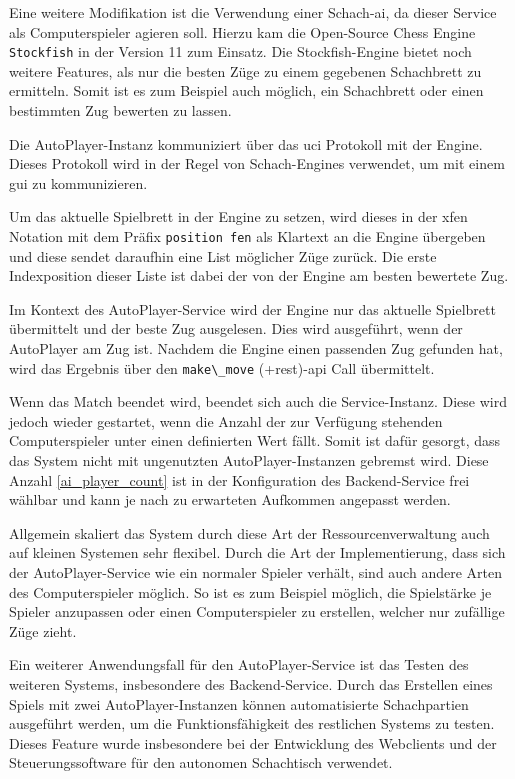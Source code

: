 Eine weitere Modifikation ist die Verwendung einer Schach-\gls{ai}, da
dieser Service als Computerspieler agieren soll. Hierzu kam die
Open-Source Chess Engine
\passthrough{\lstinline!Stockfish!}\cite{stockfish} in der Version
11 zum Einsatz. Die Stockfish-Engine bietet noch weitere Features, als
nur die besten Züge zu einem gegebenen Schachbrett zu ermitteln. Somit
ist es zum Beispiel auch möglich, ein Schachbrett oder einen bestimmten
Zug bewerten zu lassen.

Die AutoPlayer-Instanz kommuniziert über das \gls{uci}
Protokoll\cite{uciprotocol} mit der Engine. Dieses Protokoll wird in
der Regel von Schach-Engines verwendet, um mit einem \gls{gui} zu
kommunizieren.

Um das aktuelle Spielbrett in der Engine zu setzen, wird dieses in der
\gls{xfen} Notation mit dem Präfix
\passthrough{\lstinline!position fen!} als Klartext an die Engine
übergeben und diese sendet daraufhin eine List möglicher Züge zurück.
Die erste Indexposition dieser Liste ist dabei der von der Engine am
besten bewertete Zug.

Im Kontext des AutoPlayer-Service wird der Engine nur das aktuelle
Spielbrett übermittelt und der beste Zug ausgelesen. Dies wird
ausgeführt, wenn der AutoPlayer am Zug ist. Nachdem die Engine einen
passenden Zug gefunden hat, wird das Ergebnis über den
\passthrough{\lstinline!make\_move!} (+rest)-\gls{api} Call übermittelt.

Wenn das Match beendet wird, beendet sich auch die Service-Instanz.
Diese wird jedoch wieder gestartet, wenn die Anzahl der zur Verfügung
stehenden Computerspieler unter einen definierten Wert fällt. Somit ist
dafür gesorgt, dass das System nicht mit ungenutzten
AutoPlayer-Instanzen gebremst wird. Diese Anzahl \ref{ai_player_count}
ist in der Konfiguration des Backend-Service frei wählbar und kann je
nach zu erwarteten Aufkommen angepasst werden.

Allgemein skaliert das System durch diese Art der Ressourcenverwaltung
auch auf kleinen Systemen sehr flexibel. Durch die Art der
Implementierung, dass sich der AutoPlayer-Service wie ein normaler
Spieler verhält, sind auch andere Arten des Computerspieler möglich. So
ist es zum Beispiel möglich, die Spielstärke je Spieler anzupassen oder
einen Computerspieler zu erstellen, welcher nur zufällige Züge zieht.

Ein weiterer Anwendungsfall für den AutoPlayer-Service ist das Testen
des weiteren Systems, insbesondere des Backend-Service. Durch das
Erstellen eines Spiels mit zwei AutoPlayer-Instanzen können
automatisierte Schachpartien ausgeführt werden, um die
Funktionsfähigkeit des restlichen Systems zu testen. Dieses Feature
wurde insbesondere bei der Entwicklung des Webclients und der
Steuerungssoftware für den autonomen Schachtisch verwendet.


